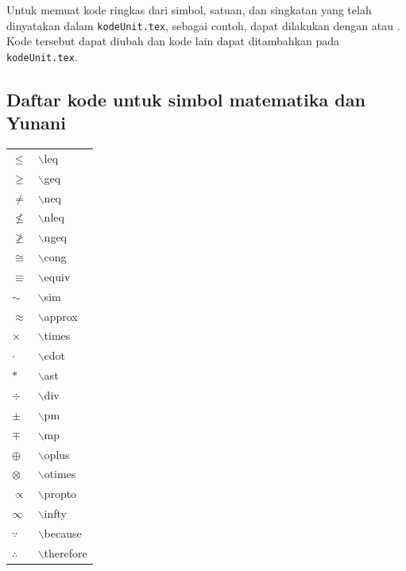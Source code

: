 Untuk memuat kode ringkas dari simbol, satuan, dan singkatan yang telah dinyatakan dalam \texttt{kodeUnit.tex}, sebagai contoh, dapat dilakukan dengan \schro{} atau \its. Kode tersebut dapat diubah dan kode lain dapat ditambahkan pada \texttt{kodeUnit.tex}.

\newpage
\subsection{Daftar kode untuk simbol matematika dan Yunani}

\begin{tabular}{l l}
$\leq$ &  $\backslash$leq \\
$\geq$ &  $\backslash$geq \\
$\neq$ &  $\backslash$neq \\
$\nleq$ &  $\backslash$nleq \\
$\ngeq$ &  $\backslash$ngeq \\
$\cong$ &  $\backslash$cong \\
$\equiv$ &  $\backslash$equiv \\
$\sim$ &  $\backslash$sim \\
$\approx$ &  $\backslash$approx \\
$\times$ &  $\backslash$times \\
$\cdot $ &  $\backslash$cdot \\
$\ast $ &  $\backslash$ast \\
$\div$ &  $\backslash$div \\
$\pm$ &  $\backslash$pm \\
$\mp$ &  $\backslash$mp \\
$\oplus$ &  $\backslash$oplus \\
$\otimes$ &  $\backslash$otimes \\
$\propto $ &  $\backslash$propto \\
$\infty$ & $\backslash$infty \\
$\because$ &  $\backslash$because \\
$\therefore$ &  $\backslash$therefore \\
\end{tabular}
\hspace*{1ex}
